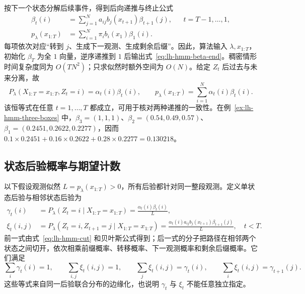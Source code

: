 按下一个状态分解后续事件，得到后向递推与终止公式
\begin{align}
\label{eq:lh-hmm-beta-rec}
 \beta_t(i)&=\sum_{j=1}^N a_{ij}b_j(x_{t+1})\beta_{t+1}(j),
 &&t=T-1,\ldots,1,\\
\label{eq:lh-hmm-beta-end}
 p_\lambda(x_{1:T})&=\sum_{i=1}^N\pi_i b_i(x_1)\beta_1(i).
\end{align}
每项依次对应“转到 $j$、生成下一观测、生成剩余后缀”。因此，算法输入 $\lambda,x_{1:T}$，初始化 $\beta_T$ 为全 $1$ 向量，逆序递推到 $1$ 后输出式~\eqref{eq:lh-hmm-beta-end}。稠密情形时间复杂度同为 $O(TN^2)$；只求似然时额外空间为 $O(N)$。给定 $Z_t$ 后过去与未来分离，故
\begin{equation}
\label{eq:lh-hmm-cut}
 P_\lambda(X_{1:T}=x_{1:T},Z_t=i)=\alpha_t(i)\beta_t(i),\qquad
 p_\lambda(x_{1:T})=\sum_{i=1}^N\alpha_t(i)\beta_t(i).
\end{equation}
该恒等式在任意 $t=1,\ldots,T$ 都成立，可用于核对两种递推的一致性。在例~\ref{ex:lh-hmm-three-boxes} 中，$\beta_3=(1,1,1)$、$\beta_2=(0.54,0.49,0.57)$、$\beta_1=(0.2451,0.2622,0.2277)$，因而 $0.1\times0.2451+0.16\times0.2622+0.28\times0.2277=0.130218$。

\subsection{状态后验概率与期望计数}

以下假设观测似然 $L=p_\lambda(x_{1:T})>0$，所有后验都针对同一整段观测。定义单状态后验与相邻状态后验为
\begin{align}
\label{eq:lh-hmm-gamma}
 \gamma_t(i)&=P_\lambda(Z_t=i\mid X_{1:T}=x_{1:T})
 =\frac{\alpha_t(i)\beta_t(i)}{L},\\
\label{eq:lh-hmm-xi}
 \xi_t(i,j)&=P_\lambda(Z_t=i,Z_{t+1}=j\mid X_{1:T}=x_{1:T})
 =\frac{\alpha_t(i)a_{ij}b_j(x_{t+1})\beta_{t+1}(j)}{L},
 \quad t<T.
\end{align}
前一式由式~\eqref{eq:lh-hmm-cut} 和贝叶斯公式得到；后一式的分子把路径在相邻两个状态之间切开，依次相乘前缀概率、转移概率、下一观测概率和剩余后缀概率。它们满足
\begin{equation}
\label{eq:lh-hmm-posterior-consistency}
 \sum_i\gamma_t(i)=1,\qquad
 \sum_{i,j}\xi_t(i,j)=1,\qquad
 \sum_j\xi_t(i,j)=\gamma_t(i),\qquad
 \sum_i\xi_t(i,j)=\gamma_{t+1}(j).
\end{equation}
这些等式来自同一后验联合分布的边缘化，也说明 $\gamma_t$ 与 $\xi_t$ 不能任意独立指定。

